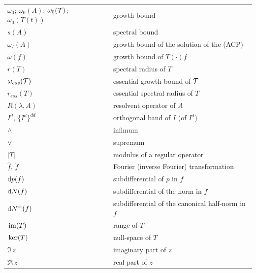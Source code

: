 \begin{longtable}{p{}p{}}
$\omega_{0}$; $\omega_{0}(A)$; $\omega_{0}(\mathcal{T})$; $\omega_{0}(T(t))$ & growth bound \\ %
$s(A)$ & spectral bound \\ %
$\omega_I(A)$ & growth bound of the solution of the (ACP) \\ %
$\omega(f)$ & growth bound of $T(\cdot)f$ \\ %
$r(T)$ & spectral radius of $T$\\ %
$\omega_{ess}(\mathcal{T})$ & essential growth bound of $\mathcal{T}$\\ %
$r_{ess}(T)$ & essential spectral radius of $T$\\ %
$R(\lambda,A)$ & resolvent operator of $A$\\ %
$I^{d}$, $\{I^{d}\}^{dd}$ & orthogonal band of $I$ (of $I^{d}$) \\ %
$\wedge$ & infimum \\ %
$\vee$ & supremum \\ %
$|T|$ & modulus of a regular operator \\ %
$\hat{f}$, $\check{f}$ & Fourier (inverse Fourier) transformation \\ %
$\mathop{}\!\mathrm{d}{p(f)}$ & subdifferential of $p$ in $f$ \\ %
$\mathop{}\!\mathrm{d}{N(f)}$ & subdifferential of the norm in $f$ \\ %
$\mathop{}\!\mathrm{d}{N^{+}}(f)$ & subdifferential of the canonical half-norm in $f$ \\ %
$\mathop{}\mathrm{im}(T)$ & range of $T$\\ %
$\mathop{}\mathrm{ker}(T)$ & null-space of $T$\\ %
$\Im \, z$ & imaginary part of $z$ \\ %
$\Re \, z$ & real part of $z$\\ %

\end{longtable}
